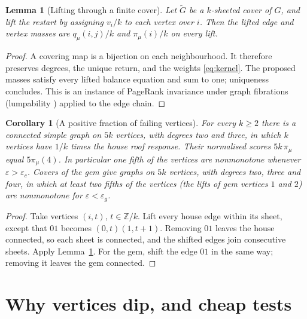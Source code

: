 \documentclass[11pt,a4paper]{article}
\newtheorem{corollary}[theorem]{Corollary}
\newtheorem{lemma}[theorem]{Lemma}
\theoremstyle{definition}\newtheorem{conjecture}{Conjecture}
\theoremstyle{remark}\newtheorem{remark}[theorem]{Remark}
\newcommand{\eps}{\varepsilon}
\begin{document}
\begin{lemma}[Lifting through a finite cover]\label{lem:cover}
Let $\widetilde G$ be a $k$-sheeted cover of $G$, and lift the restart by assigning $v_i/k$ to each vertex over $i$. Then the lifted edge and vertex masses are $q_\mu(i,j)/k$ and $\pi_\mu(i)/k$ on every lift.
\end{lemma}
\begin{proof}
A covering map is a bijection on each neighbourhood. It therefore preserves degrees, the unique return, and the weights \eqref{eq:kernel}. The proposed masses satisfy every lifted balance equation and sum to one; uniqueness concludes. This is an instance of PageRank invariance under graph fibrations \cite{boldifib} (lumpability \cite{kemenysnell}) applied to the edge chain.
\end{proof}

\begin{corollary}[A positive fraction of failing vertices]\label{cor:family}
For every $k\geq2$ there is a connected simple graph on $5k$ vertices, with degrees two and three, in which $k$ vertices have $1/k$ times the house roof response. Their normalised scores $5k\,\pi_\mu$ equal $5\pi_\mu(4)$. In particular one fifth of the vertices are nonmonotone whenever $\eps>\eps_c$. Covers of the gem give graphs on $5k$ vertices, with degrees two, three and four, in which at least two fifths of the vertices (the lifts of gem vertices $1$ and $2$) are nonmonotone for $\eps<\eps_g$.
\end{corollary}
\begin{proof}
Take vertices $(i,t)$, $t\in\mathbb Z/k$. Lift every house edge within its sheet, except that $01$ becomes $(0,t)(1,t+1)$. Removing $01$ leaves the house connected, so each sheet is connected, and the shifted edges join consecutive sheets. Apply Lemma~\ref{lem:cover}. For the gem, shift the edge $01$ in the same way; removing it leaves the gem connected.
\end{proof}

\section{Why vertices dip, and cheap tests}\label{sec:why}
\end{document}
